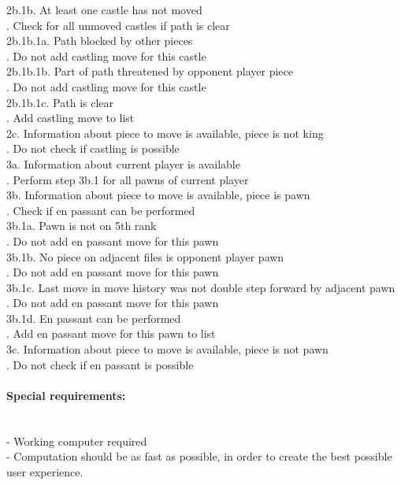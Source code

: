 \documentclass{article}
\begin{document}
\indent\indent2b.1b. At least one castle has not moved\\
\indent\indent{}. Check for all unmoved castles if path is clear\\
\indent\indent\indent\indent2b.1b.1a. Path blocked by other pieces\\
\indent\indent\indent\indent{}. Do not add castling move for this castle\\
\indent\indent\indent\indent2b.1b.1b. Part of path threatened by opponent player piece\\
\indent\indent\indent\indent{}. Do not add castling move for this castle\\
\indent\indent\indent\indent2b.1b.1c. Path is clear\\
\indent\indent\indent\indent{}. Add castling move to list\\
2c. Information about piece to move is available, piece is not king\\
. Do not check if castling is possible\\
3a. Information about current player is available\\
. Perform step 3b.1 for all pawns of current player\\
3b. Information about piece to move is available, piece is pawn\\
. Check if en passant can be performed\\
\indent\indent3b.1a. Pawn is not on 5th rank\\
\indent\indent{}. Do not add en passant move for this pawn\\
\indent\indent3b.1b. No piece on adjacent files is opponent player pawn\\
\indent\indent{}. Do not add en passant move for this pawn\\
\indent\indent3b.1c. Last move in move history was not double step forward by adjacent pawn\\
\indent\indent{}. Do not add en passant move for this pawn\\
\indent\indent3b.1d. En passant can be performed\\
\indent\indent{}. Add en passant move for this pawn to list\\
3c. Information about piece to move is available, piece is not pawn\\
. Do not check if en passant is possible

\paragraph{Special requirements:}\mbox{}\\
- Working computer required\\
- Computation should be as fast as possible, in order to create the best possible user experience.
\end{document}
